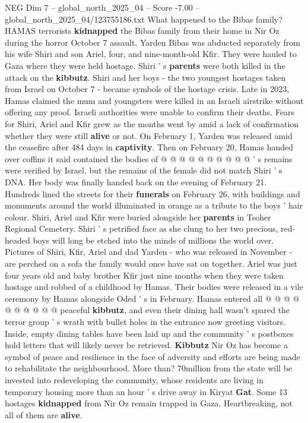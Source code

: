 \begin{textsample}{NEG Dim 7 – global\_north\_2025\_04 – Score -7.00 – global\_north\_2025\_04/123755186.txt}  \label{ex:f7_neg_100}
What happened to the Bibas family?
HAMAS terrorists \textbf{kidnapped} the Bibas family from their home in Nir Oz during the horror October 7 assault.
Yarden Bibas was abducted separately from his wife Shiri and son Ariel, four, and nine-month-old Kfir.
They were hauled to Gaza where they were held hostage.
Shiri ' s \textbf{parents} were both killed in the attack on the \textbf{kibbutz}.
Shiri and her boys - the two youngest hostages taken from Israel on October 7 - became symbols of the hostage crisis.
Late in 2023, Hamas claimed the mum and youngsters were killed in an Israeli airstrike without offering any proof.
Israeli authorities were unable to confirm their deaths.
Fears for Shiri, Ariel and Kfir grew as the months went by amid a lack of confirmation whether they were still \textbf{alive} or not.
On February 1, Yarden was released amid the ceasefire after 484 days in \textbf{captivity}.
Then on February 20, Hamas handed over coffins it said contained the bodies of @ @ @ @ @ @ @ @ @ @ ' s remains were verified by Israel, but the remains of the female did not match Shiri ' s DNA.
Her body was finally handed back on the evening of February 21.
Hundreds lined the streets for their \textbf{funerals} on February 26, with buildings and monuments around the world illuminated in orange as a tribute to the boys ' hair colour.
Shiri, Ariel and Kfir were buried alongside her \textbf{parents} in Tsoher Regional Cemetery.
Shiri ' s petrified face as she clung to her two precious, red-headed boys will long be etched into the minds of millions the world over.
Pictures of Shiri, Kfir, Ariel and dad Yarden - who was released in November - are perched on a sofa the family would once have sat on together.
Ariel was just four years old and baby brother Kfir just nine months when they were taken hostage and robbed of a childhood by Hamas.
Their bodies were released in a vile ceremony by Hamas alongside Oded ' s in February.
Hamas entered all @ @ @ @ @ @ @ @ @ @ peaceful \textbf{kibbutz}, and even their dining hall wasn't spared the terror group ' s wrath with bullet holes in the entrance now greeting visitors.
Inside, empty dining tables have been laid up and the community ' s postboxes hold letters that will likely never be retrieved. \textbf{Kibbutz} Nir Oz has become a symbol of peace and resilience in the face of adversity and efforts are being made to rehabilitate the neighbourhood.
More than? 70million from the state will be invested into redeveloping the community, whose residents are living in temporary housing more than an hour ' s drive away in Kiryat \textbf{Gat}.
Some 13 hostages \textbf{kidnapped} from Nir Oz remain trapped in Gaza.
Heartbreaking, not all of them are \textbf{alive}.

\end{textsample}
